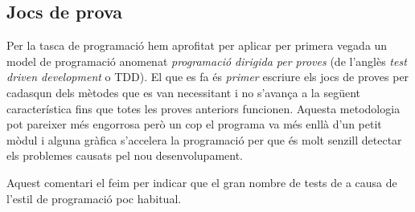 
\newpage

\subsection{Jocs de prova}

Per la tasca de programació hem aprofitat per aplicar per primera vegada un
model de programació anomenat \emph{programació dirigida per proves} (de
l'anglès \emph{test driven development} o TDD). El que es fa és \emph{primer}
escriure els jocs de proves per cadasqun dels mètodes que es van necessitant i
no s'avança a la següent característica fins que totes les proves anteriors
funcionen. Aquesta metodologia pot pareixer més engorrosa però un cop el
programa va més enllà d'un petit mòdul i alguna gràfica s'accelera la
programació per que és molt senzill detectar els problemes causats pel nou
desenvolupament.

Aquest comentari el feim per indicar que el gran nombre de tests de a causa de
l'estil de programació poc habitual.


\newpage

\addtolength{\hoffset}{+2cm}
